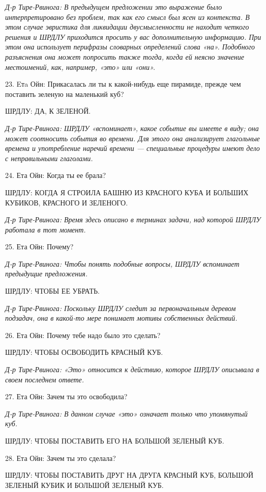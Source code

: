 \emph{Д-р Тире-Рвинога: В предыдущем предложении это выражение было интерпретировано без проблем, так как его смысл был ясен из контекста. В этом случае эвристика для ликвидации двусмысленности не находит четкого решения и ШРДЛУ приходится просить у вас дополнительную информацию. При этом она использует перифразы словарных определений слова «на». Подобного разъяснения она может попросить также тогда, когда ей неясно значение местоимений, как, например, «это» или «они».}

23. Eтa Ойн: Прикасалась ли ты к какой-нибудь еще пирамиде, прежде чем поставить зеленую на маленький куб?

ШРДЛУ: ДА, К ЗЕЛЕНОЙ.

\emph{Д-р Тире-Рвинога: ШРДЛУ «вспоминает», какое событие вы имеете в виду; она может соотносить события во времени. Для этого она анализирует глагольные времена и употребление наречий времени --- специальные процедуры имеют дело с неправильными глаголами.}

24. Ета Ойн: Когда ты ее брала?

ШРДЛУ: КОГДА Я СТРОИЛА БАШНЮ ИЗ КРАСНОГО КУБА И БОЛЬШИХ КУБИКОВ, КРАСНОГО И ЗЕЛЕНОГО.

\emph{Д-р Тире-Рвинога: Время здесь описано в терминах задачи, над которой ШРДЛУ работала в тот момент.}

25. Ета Ойн: Почему?

\emph{Д-р Тире-Рвинога: Чтобы понять подобные вопросы, ШРДЛУ вспоминает предыдущие предложения.}

ШРДЛУ: ЧТОБЫ ЕЕ УБРАТЬ.

\emph{Д-р Тире-Рвинога: Поскольку ШРДЛУ следит за первоначальным деревом подзадач, она в какой-то мере понимает мотивы собственных действий.}

26. Ета Ойн: Почему тебе надо было это сделать?

ШРДЛУ: ЧТОБЫ ОСВОБОДИТЬ КРАСНЫЙ КУБ.

\emph{Д-р Тире-Рвинога: «Это» относится к действию, которое ШРДЛУ описывала в своем последнем ответе.}

27. Ета Ойн: Зачем ты это освободила?

\emph{Д-р Тире-Рвинога: В данном случае «это» означает только что упомянутый куб.}

ШРДЛУ: ЧТОБЫ ПОСТАВИТЬ ЕГО НА БОЛЬШОЙ ЗЕЛЕНЫЙ КУБ.

28. Ета Ойн: Зачем ты это сделала?

ШРДЛУ: ЧТОБЫ ПОСТАВИТЬ ДРУГ НА ДРУГА КРАСНЫЙ КУБ, БОЛЬШОЙ ЗЕЛЕНЫЙ КУБИК И БОЛЬШОЙ ЗЕЛЕНЫЙ КУБ.

